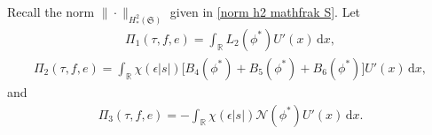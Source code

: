\documentclass[10pt, reqno]{amsart}
\numberwithin{equation}{section}
\theoremstyle{definition}
\begin{document}
{%
%
%


\medskip
Recall the norm $\|\cdot\|_{H^2_*(\mathfrak S)} $ given in \eqref{norm h2 mathfrak S}.
Let
\begin{align} \label{Pi1}
\Pi_1(\tau, f, e) = \int_{{\mathbb R}} L_2(\phi^*) U'(x)\,{\mathrm d}x,
\end{align}
\begin{align} \label{Pi2}
\Pi_2(\tau, f, e) = \int_{{\mathbb R}} \chi(\epsilon|s|) \Big[B_4(\phi^*)+ B_5(\phi^*)+ B_6(\phi^*)\Big] U'(x)\,{\mathrm d}x,
\end{align}
and
\begin{align} \label{Pi3}
\Pi_3(\tau, f, e) = -\int_{{\mathbb R}}\chi(\epsilon|s|) {\mathcal N}(\phi^*) U'(x)\,{\mathrm d}x.
\end{align}

}
\end{document}
